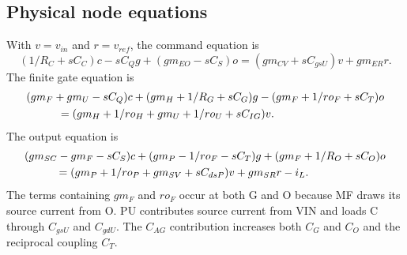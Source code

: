 \documentclass[11pt]{article}
\begin{document}
\subsection*{Physical node equations}
With $v=v_{in}$ and $r=v_{ref}$, the command equation is
\begin{equation}
(1/R_C+sC_C)c-sC_Qg+(gm_{EO}-sC_S)o
=(gm_{CV}+sC_{gsU})v+gm_{ER}r.
\end{equation}
The finite gate equation is
\begin{align}
&(gm_F+gm_U-sC_Q)c+(gm_H+1/R_G+sC_G)g
-(gm_F+1/ro_F+sC_T)o\notag\\
&\hspace{10mm}=(gm_H+1/ro_H+gm_U+1/ro_U+sC_{IG})v.
\end{align}
The output equation is
\begin{align}
&(gm_{SC}-gm_F-sC_S)c+(gm_P-1/ro_F-sC_T)g
+(gm_F+1/R_O+sC_O)o\notag\\
&\hspace{10mm}=(gm_P+1/ro_P+gm_{SV}+sC_{dsP})v+gm_{SR}r-i_L.
\end{align}
The terms containing $gm_F$ and $ro_F$ occur at both G and O because MF draws its source current from O. PU contributes source current from VIN and loads C through $C_{gsU}$ and $C_{gdU}$. The $C_{AG}$ contribution increases both $C_G$ and $C_O$ and the reciprocal coupling $C_T$.
\end{document}

